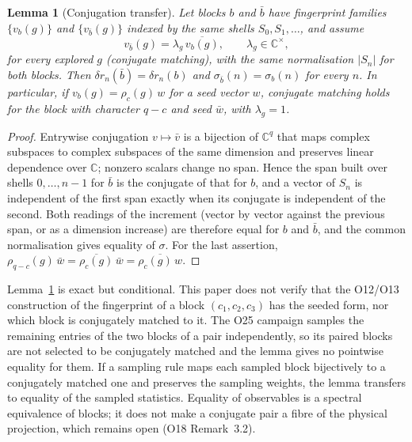 \documentclass[12pt,a4paper]{article}
\newtheorem{lemma}[theorem]{Lemma}
\theoremstyle{definition}
\theoremstyle{remark}
\begin{document}
      \begin{lemma}[Conjugation transfer]\label{lem:conjugation}
        Let blocks $b$ and $\bar b$ have fingerprint families $\{v_b(g)\}$ and $\{v_{\bar b}(g)\}$ indexed by the same
        shells $S_0, S_1, \dots$, and assume
        \begin{equation}\label{eq:biparity}
          v_{\bar b}(g) = \lambda_g\,\overline{v_b(g)}, \qquad \lambda_g \in \mathbb{C}^\times,
        \end{equation}
        for every explored $g$ (conjugate matching), with the same normalisation $|S_n|$ for both blocks.
        Then $\delta r_n(\bar b) = \delta r_n(b)$ and $\sigma_{\bar b}(n) = \sigma_b(n)$ for every $n$.
        In particular, if $v_b(g) = \rho_c(g)\,w$ for a seed vector $w$, conjugate matching holds for the block with
        character $q-c$ and seed $\bar w$, with $\lambda_g = 1$.
      \end{lemma}

      \begin{proof}
        Entrywise conjugation $v \mapsto \bar v$ is a bijection of $\mathbb{C}^q$ that maps complex subspaces to
        complex subspaces of the same dimension and preserves linear dependence over $\mathbb{C}$; nonzero scalars
        change no span.
        Hence the span built over shells $0, \dots, n-1$ for $\bar b$ is the conjugate of that for $b$, and a vector
        of $S_n$ is independent of the first span exactly when its conjugate is independent of the second.
        Both readings of the increment (vector by vector against the previous span, or as a dimension increase) are
        therefore equal for $b$ and $\bar b$, and the common normalisation gives equality of $\sigma$.
        For the last assertion, $\rho_{q-c}(g)\,\bar w = \overline{\rho_c(g)}\,\bar w = \overline{\rho_c(g)\,w}$.
      \end{proof}

      Lemma~\ref{lem:conjugation} is exact but conditional.
      This paper does not verify that the O12/O13 construction of the fingerprint of a block
      $(c_1, c_2, c_3)$ has the seeded form, nor which block is conjugately matched to it.
      The O25 campaign samples the remaining entries of the two blocks of a pair independently, so its paired blocks
      are not selected to be conjugately matched and the lemma gives no pointwise equality for them.
      If a sampling rule maps each sampled block bijectively to a conjugately matched one and preserves the sampling
      weights, the lemma transfers to equality of the sampled statistics.
      Equality of observables is a spectral equivalence of blocks; it does not make a conjugate pair a fibre of the
      physical projection, which remains open (O18 Remark~3.2).
\end{document}
